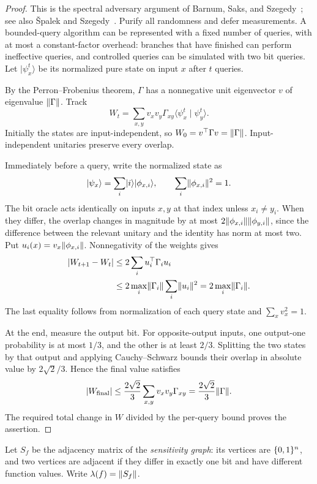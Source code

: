 \begin{proof}
This is the spectral adversary argument of
Barnum, Saks, and Szegedy~\cite{BSS03}; see also
\v{S}palek and Szegedy~\cite{SpalekSzegedy06}.
Purify all randomness and defer measurements. A bounded-query algorithm
can be represented with a fixed number of queries, with at most a
constant-factor overhead: branches that have finished can perform
ineffective queries, and controlled queries can be simulated with two
bit queries. Let $\lvert\psi_x^t\rangle$ be its normalized pure state
on input $x$ after $t$ queries.

By the Perron--Frobenius theorem, $\Gamma$ has a nonnegative unit
eigenvector $v$ of eigenvalue $\lVert\Gamma\rVert$. Track
\[
 W_t=\sum_{x,y}v_xv_y\Gamma_{xy}
            \langle\psi_x^t\mid\psi_y^t\rangle.
\]
Initially the states are input-independent, so
$W_0=v^\top\Gamma v=\lVert\Gamma\rVert$. Input-independent unitaries
preserve every overlap.

Immediately before a query, write the normalized state as
\[
 \lvert\psi_x\rangle=\sum_i\lvert i\rangle\lvert\phi_{x,i}\rangle,
 \qquad \sum_i\lVert\phi_{x,i}\rVert^2=1.
\]
The bit oracle acts identically
on inputs $x,y$ at that index unless $x_i\ne y_i$. When they differ,
the overlap changes in magnitude by at most
$2\lVert\phi_{x,i}\rVert\lVert\phi_{y,i}\rVert$, since the difference between
the relevant unitary and the identity has norm at most two. Put
$u_i(x)=v_x\lVert\phi_{x,i}\rVert$. Nonnegativity of the weights gives
\begin{align*}
 \lvert W_{t+1}-W_t\rvert
 &\le2\sum_i u_i^\top\Gamma_i u_i\\
 &\le2\max_i\lVert\Gamma_i\rVert\sum_i\lVert u_i\rVert^2
  =2\max_i\lVert\Gamma_i\rVert.
\end{align*}
The last equality follows from normalization of each query state and
$\sum_xv_x^2=1$.

At the end, measure the output bit. For opposite-output inputs, one
output-one probability is at most $1/3$, and the other is at least
$2/3$. Splitting the two states by that output and applying
Cauchy--Schwarz bounds their overlap in absolute value by
$2\sqrt2/3$. Hence the final value satisfies
\[
 \lvert W_{\mathrm{final}}\rvert
 \le\frac{2\sqrt2}{3}\sum_{x,y}v_xv_y\Gamma_{xy}
 =\frac{2\sqrt2}{3}\lVert\Gamma\rVert.
\]
The required total change in $W$ divided by the per-query bound proves
the assertion.
\end{proof}

Let $S_f$ be the adjacency matrix of the \emph{sensitivity graph}: its
vertices are $\{0,1\}^n$, and two vertices are adjacent if they differ
in exactly one bit and have different function values. Write
$\lambda(f)=\lVert S_f\rVert$.


